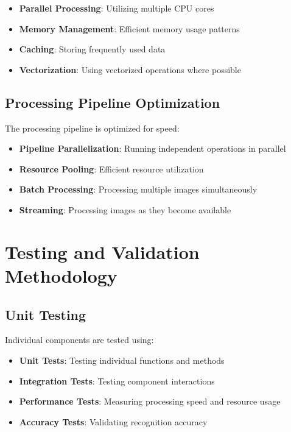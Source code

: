 \begin{itemize}
\item \textbf{Parallel Processing}: Utilizing multiple CPU cores
\item \textbf{Memory Management}: Efficient memory usage patterns
\item \textbf{Caching}: Storing frequently used data
\item \textbf{Vectorization}: Using vectorized operations where possible
\end{itemize}

\subsection{Processing Pipeline Optimization}

The processing pipeline is optimized for speed:

\begin{itemize}
\item \textbf{Pipeline Parallelization}: Running independent operations in parallel
\item \textbf{Resource Pooling}: Efficient resource utilization
\item \textbf{Batch Processing}: Processing multiple images simultaneously
\item \textbf{Streaming}: Processing images as they become available
\end{itemize}

\section{Testing and Validation Methodology}

\subsection{Unit Testing}

Individual components are tested using:

\begin{itemize}
\item \textbf{Unit Tests}: Testing individual functions and methods
\item \textbf{Integration Tests}: Testing component interactions
\item \textbf{Performance Tests}: Measuring processing speed and resource usage
\item \textbf{Accuracy Tests}: Validating recognition accuracy
\end{itemize}


